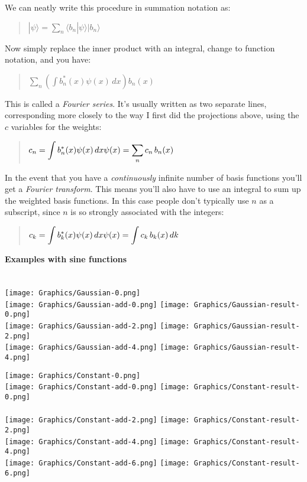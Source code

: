 \documentclass{article}
\def\ket#1{|#1\rangle}
\def\braket#1#2{\langle#1|#2\rangle}
\newcommand{\head}[1]{ \vspace{12pt} {\bf #1} \vspace{-12pt}\\ }
\def\p{ \vspace{10pt}\\ }
\begin{document}
We can neatly write this procedure in summation notation as:

\begin{quote}
$\ket{\psi} = \displaystyle{\sum_n} \braket{b_n}{\psi} \ket{b_n}$
\end{quote}

Now simply replace the inner product with an integral, change to function
notation, and you have:
\begin{quote}
$
\displaystyle\sum_n
\left(\displaystyle\int b_n^*(x)\psi(x)\,dx \right)b_n(x)
$
\end{quote}

This is called a {\it Fourier series}. It's usually written as two separate
lines, corresponding more closely to the way I first did the projections
above, using the $c$ variables for the weights:
\begin{quote}
$
c_n = \displaystyle\int b_n^*(x)\psi(x)\,dx\p
\psi(x) = \displaystyle\sum_n c_n\,b_n(x)
$
\end{quote}

In the event that you have a {\it continuously} infinite number of basis
functions you'll get a {\it Fourier transform}. This means you'll
also have to use an integral to sum up the weighted basis functions. In this
case people don't typically use $n$ as a subscript, since $n$ is so strongly
associated with the integers:
\begin{quote}
$
c_k = \displaystyle\int b_k^*(x)\psi(x)\,dx\p
\psi(x) = \displaystyle\int c_k\, b_k(x)\, dk
$
\end{quote}

\head{Examples with sine functions}
\\\\
\texttt{[image: Graphics/Gaussian-0.png]}
\\
\texttt{[image: Graphics/Gaussian-add-0.png]}
\texttt{[image: Graphics/Gaussian-result-0.png]}
\\
\texttt{[image: Graphics/Gaussian-add-2.png]}
\texttt{[image: Graphics/Gaussian-result-2.png]}
\\
\texttt{[image: Graphics/Gaussian-add-4.png]}
\texttt{[image: Graphics/Gaussian-result-4.png]}

\pagebreak

\texttt{[image: Graphics/Constant-0.png]}
\\
\texttt{[image: Graphics/Constant-add-0.png]}
\texttt{[image: Graphics/Constant-result-0.png]}
\\
\\
\texttt{[image: Graphics/Constant-add-2.png]}
\texttt{[image: Graphics/Constant-result-2.png]}
\\
\texttt{[image: Graphics/Constant-add-4.png]}
\texttt{[image: Graphics/Constant-result-4.png]}
\\
\texttt{[image: Graphics/Constant-add-6.png]}
\texttt{[image: Graphics/Constant-result-6.png]}
\end{document}
